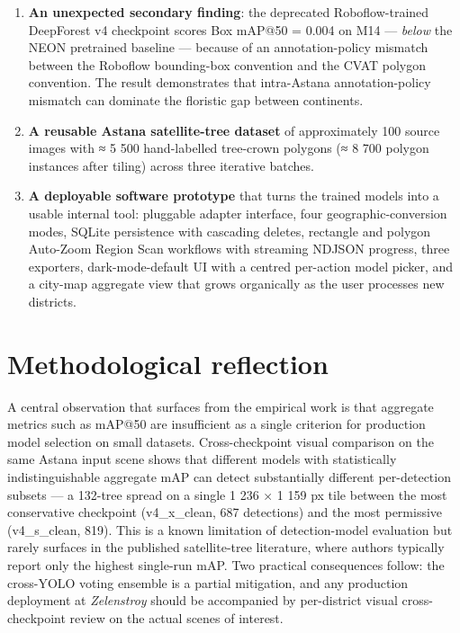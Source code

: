 \begin{enumerate}
\item
  \textbf{An unexpected secondary finding}: the deprecated Roboflow-trained DeepForest v4 checkpoint scores Box mAP@50 = 0.004 on M14 --- \emph{below} the NEON pretrained baseline --- because of an annotation-policy mismatch between the Roboflow bounding-box convention and the CVAT polygon convention. The result demonstrates that intra-Astana annotation-policy mismatch can dominate the floristic gap between continents.
\item
  \textbf{A reusable Astana satellite-tree dataset} of approximately 100 source images with ≈ 5 500 hand-labelled tree-crown polygons (≈ 8 700 polygon instances after tiling) across three iterative batches.
\item
  \textbf{A deployable software prototype} that turns the trained models into a usable internal tool: pluggable adapter interface, four geographic-conversion modes, SQLite persistence with cascading deletes, rectangle and polygon Auto-Zoom Region Scan workflows with streaming NDJSON progress, three exporters, dark-mode-default UI with a centred per-action model picker, and a city-map aggregate view that grows organically as the user processes new districts.
\end{enumerate}

\section{Methodological reflection}\label{methodological-reflection}

A central observation that surfaces from the empirical work is that aggregate metrics such as mAP@50 are insufficient as a single criterion for production model selection on small datasets. Cross-checkpoint visual comparison on the same Astana input scene shows that different models with statistically indistinguishable aggregate mAP can detect substantially different per-detection subsets --- a 132-tree spread on a single 1 236 × 1 159 px tile between the most conservative checkpoint (v4\_x\_clean, 687 detections) and the most permissive (v4\_s\_clean, 819). This is a known limitation of detection-model evaluation but rarely surfaces in the published satellite-tree literature, where authors typically report only the highest single-run mAP. Two practical consequences follow: the cross-YOLO voting ensemble is a partial mitigation, and any production deployment at \emph{Zelenstroy} should be accompanied by per-district visual cross-checkpoint review on the actual scenes of interest.

